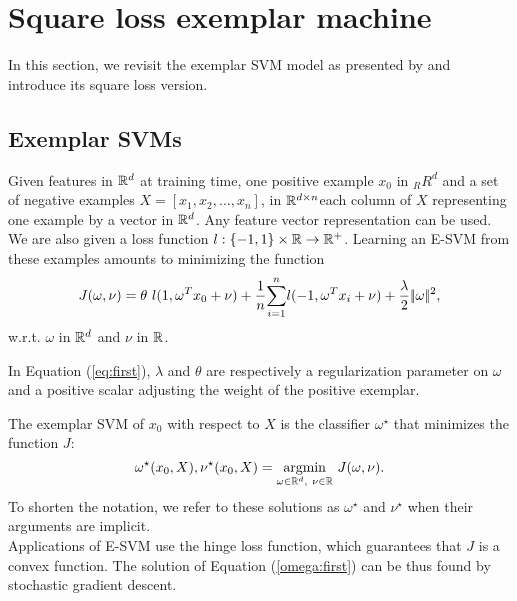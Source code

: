 \section{Square loss exemplar machine}\label{lsesvm}
In this section, we revisit the exemplar SVM model as presented by \cite{Efros11} and introduce its square loss version.
\subsection{Exemplar SVMs} \label{esvm}
Given features in $\mathbb R^d$ at training time, one positive example $x_0$ in $_RR^d$ and a set of negative examples $X = [x_1, x_2,...,x_n]$, in $\mathbb R^{d\times n}$each column of $X$ representing one example by a vector in $\mathbb R^d$. 
Any feature vector representation can be used.
We are also given a loss function $l:\{-1, 1\}\times \mathbb R\rightarrow\mathbb R^+$. Learning an E-SVM from these examples amounts to minimizing the function 
\begin{equation}
J(\omega, \nu) = \theta \ l(1, \omega^Tx_0+\nu) +\dfrac{1}{n}\displaystyle{\sum_{i=1}^n} l(-1, \omega^T x_i+\nu)+\dfrac{\lambda}{2}|\!|\omega|\!|^2, \label{eq:first}
\end{equation}
w.r.t. $\omega$ in $\mathbb R^d$ and $\nu$ in $\mathbb R$.

In Equation (\ref{eq:first}), $\lambda$ and $\theta$ are respectively a regularization parameter on $\omega$ and a positive scalar adjusting the weight of the positive exemplar.

The  exemplar SVM of $x_0$ with respect to $X$ is the classifier $\omega^\star$ that minimizes the function $J$:
\begin{equation}
\omega^\star(x_0, X), \nu^\star(x_0, X) = \underset{\omega\in\mathbb R^d, \ \nu\in\mathbb R}{\operatorname*{argmin}} \ J(\omega, \nu). \label{omega:first}
\end{equation}
To shorten the notation, we refer to these solutions as $\omega^\star$ and $\nu^\star$ when their arguments are implicit.\\
Applications of E-SVM use the hinge loss function, which guarantees that $J$ is a convex function. The solution of Equation (\ref{omega:first}) can be thus found by stochastic gradient descent.

